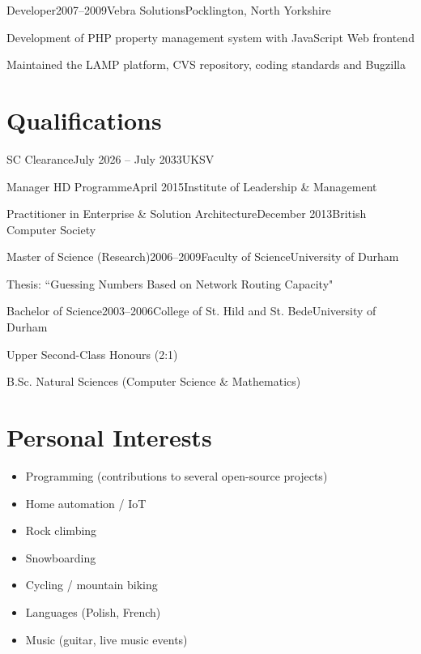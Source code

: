 \documentclass{cv}
\begin{document}

\begin{experience}{Developer}{2007--2009}{Vebra Solutions}{Pocklington, North Yorkshire}
\item Development of PHP property management system with JavaScript Web frontend
\item Maintained the LAMP platform, CVS repository, coding standards and Bugzilla
\end{experience}


\section{Qualifications}

\begin{experienceplain}{SC Clearance}{July 2026 -- July 2033}{UKSV}{}
\end{experienceplain}

\begin{experienceplain}{Manager HD Programme}{April 2015}{Institute of Leadership \& Management}{}
\end{experienceplain}

\begin{experienceplain}{Practitioner in Enterprise \& Solution Architecture}{December 2013}{British Computer Society}{}
\end{experienceplain}

\begin{experience}{Master of Science (Research)}{2006--2009}{Faculty of Science}{University of Durham}
\item Thesis: ``Guessing Numbers Based on Network Routing Capacity"
\end{experience}

\begin{experience}{Bachelor of Science}{2003--2006}{College of St. Hild and St. Bede}{University of Durham}
\item Upper Second-Class Honours (2:1)
\item B.Sc. Natural Sciences (Computer Science \& Mathematics)
\end{experience}


\section{Personal Interests}

\begin{itemize}
\item Programming (contributions to several open-source projects)
\item Home automation / IoT
\item Rock climbing
\item Snowboarding
\item Cycling / mountain biking
\item Languages (Polish, French)
\item Music (guitar, live music events)
\end{itemize}
\end{document}
